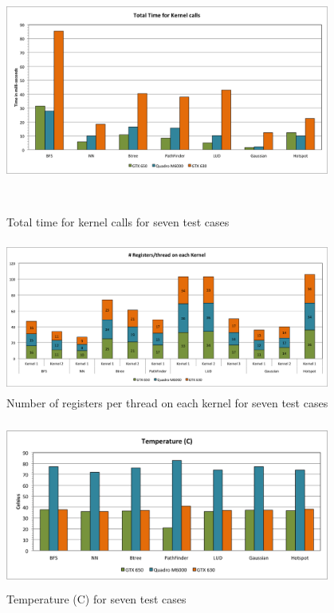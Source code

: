 \documentclass[paper=a4, fontsize=11pt]{scrartcl}
\numberwithin{equation}{section}		%
\numberwithin{figure}{section}			%
\numberwithin{table}{section}				%
\begin{document}
\begin{figure}[!h]
\centering
\includegraphics[width=0.95\textwidth,height=8cm]{../imgs/kernel_calls.png}
\caption{Total time for kernel calls for seven test cases}
\label{fig:totalKERNEL}
\end{figure}

\begin{figure}[!h]
\centering
\includegraphics[width=0.95\textwidth,height=5cm]{../imgs/register_thread.png}
\caption{Number of registers per thread on each kernel for seven test cases}
\label{fig:regperthread}
\end{figure}

\begin{figure}[!h]
\centering
\includegraphics[width=0.95\textwidth,height=5.5cm]{../imgs/temp.png}
\caption{Temperature (C) for seven test cases}
\label{fig:temp}
\end{figure}
\end{document}
